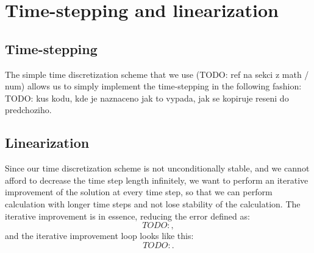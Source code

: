 \section{Time-stepping and linearization}

\subsection{Time-stepping}
The simple time discretization scheme that we use (TODO: ref na sekci z math / num) allows us to simply implement the time-stepping in the following fashion:
TODO: kus kodu, kde je naznaceno jak to vypada, jak se kopiruje reseni do predchoziho.



\subsection{Linearization}
Since our time discretization scheme is not unconditionally stable, and we cannot afford to decrease the time step length infinitely, we want to perform an iterative improvement of the solution at every time step, so that we can perform calculation with longer time steps and not lose stability of the calculation.
The iterative improvement is in essence, reducing the error defined as:
$$
TODO:
,
$$
and the iterative improvement loop looks like this:
$$
TODO:
.
$$